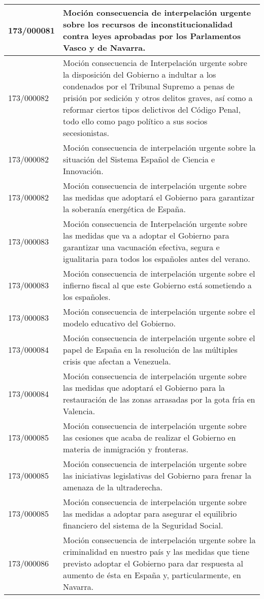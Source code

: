 {\begin{table}[H]
\begin{center}
\begin{tabularx}{\linewidth}{| l | X |}
\hline
173/000081 & Moción consecuencia de interpelación urgente sobre los recursos de inconstitucionalidad contra leyes aprobadas por los Parlamentos Vasco y de Navarra. \\
\hline
173/000082 & Moción consecuencia de Interpelación urgente sobre la disposición del Gobierno a indultar a los condenados por el Tribunal Supremo a penas de prisión por sedición y otros delitos graves, así como a reformar ciertos tipos delictivos del Código Penal, todo ello como pago político a sus socios secesionistas. \\
\hline
173/000082 & Moción consecuencia de interpelación urgente sobre la situación del Sistema Español de Ciencia e Innovación. \\
\hline
173/000082 & Moción consecuencia de interpelación urgente sobre las medidas que adoptará el Gobierno para garantizar la soberanía energética de España. \\
\hline
173/000083 & Moción consecuencia de Interpelación urgente sobre las medidas que va a adoptar el Gobierno para garantizar una vacunación efectiva, segura e igualitaria para todos los españoles antes del verano. \\
\hline
173/000083 & Moción consecuencia de interpelación urgente sobre el infierno fiscal al que este Gobierno está sometiendo a los españoles. \\
\hline
173/000083 & Moción consecuencia de interpelación urgente sobre el modelo educativo del Gobierno. \\
\hline
173/000084 & Moción consecuencia de interpelación urgente sobre el papel de España en la resolución de las múltiples crisis que afectan a Venezuela. \\
\hline
173/000084 & Moción consecuencia de interpelación urgente sobre las medidas que adoptará el Gobierno para la restauración de las zonas arrasadas por la gota fría en Valencia. \\
\hline
173/000085 & Moción consecuencia de interpelación urgente sobre las cesiones que acaba de realizar el Gobierno en materia de inmigración y fronteras. \\
\hline
173/000085 & Moción consecuencia de interpelación urgente sobre las iniciativas legislativas del Gobierno para frenar la amenaza de la ultraderecha. \\
\hline
173/000085 & Moción consecuencia de interpelación urgente sobre las medidas a adoptar para asegurar el equilibrio financiero del sistema de la Seguridad Social. \\
\hline
173/000086 & Moción consecuencia de interpelación urgente sobre la criminalidad en nuestro país y las medidas que tiene previsto adoptar el Gobierno para dar respuesta al aumento de ésta en España y, particularmente, en Navarra. \\

\end{tabularx}
\end{center}
\end{table}}
